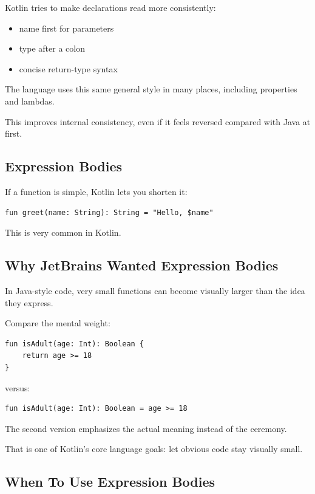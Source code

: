 \documentclass[11pt,a4paper]{article}
\begin{document}
Kotlin tries to make declarations read more consistently:
\begin{itemize}
    \item name first for parameters
    \item type after a colon
    \item concise return-type syntax
\end{itemize}

The language uses this same general style in many places, including properties and lambdas.

This improves internal consistency, even if it feels reversed compared with Java at first.

\subsection{Expression Bodies}

If a function is simple, Kotlin lets you shorten it:

\begin{lstlisting}[style=kazekotlin]
fun greet(name: String): String = "Hello, $name"
\end{lstlisting}

This is very common in Kotlin.

\subsection{Why JetBrains Wanted Expression Bodies}

In Java-style code, very small functions can become visually larger than the idea they express.

Compare the mental weight:

\begin{lstlisting}[style=kazekotlin]
fun isAdult(age: Int): Boolean {
    return age >= 18
}
\end{lstlisting}

versus:

\begin{lstlisting}[style=kazekotlin]
fun isAdult(age: Int): Boolean = age >= 18
\end{lstlisting}

The second version emphasizes the actual meaning instead of the ceremony.

That is one of Kotlin's core language goals: let obvious code stay visually small.

\subsection{When To Use Expression Bodies}
\end{document}
